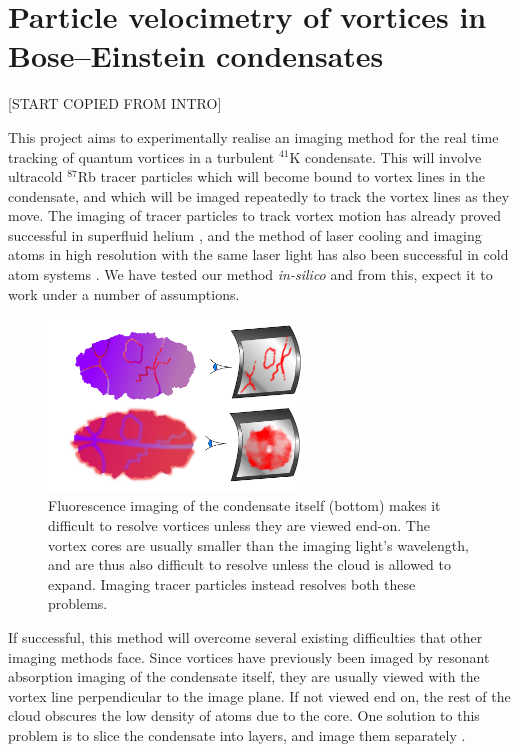 
\chapter{Particle velocimetry of vortices in Bose–Einstein condensates}\label{chap:velocimetry}

[START COPIED FROM INTRO]

This project aims to experimentally realise an imaging method for the real time tracking of quantum vortices in a turbulent $^{41}$K condensate. This will involve ultracold $^{87}$Rb tracer particles which will become bound to vortex lines in the condensate, and which will be imaged repeatedly to track the vortex lines as they move. The imaging of tracer particles to track vortex motion has already proved successful in superfluid helium \cite{bewley_generation_2009, bewley_superfluid_2006, packard_vortex_1982}, and the method of laser cooling and imaging atoms in high resolution with the same laser light has also been successful in cold atom systems \cite{bakr_quantum_2009}. We have tested our method \textit{in-silico} \cite{billington_particle_2010} and from this, expect it to work under a number of assumptions.

\begin{figure}
\begin{center}
\includegraphics[width=0.6\textwidth]{figures/unsorted/side-on.pdf}
\caption{\label{fig:side-on}Fluorescence imaging of the condensate itself (bottom) makes it difficult to resolve vortices unless they are viewed end-on. The vortex cores are usually smaller than the imaging light's wavelength, and are thus also difficult to resolve unless the cloud is allowed to expand. Imaging tracer particles instead resolves both these problems.}
\end{center}
\end{figure}

If successful, this method will overcome several existing difficulties that other imaging methods face. Since vortices have previously been imaged by resonant absorption imaging of the condensate itself, they are usually viewed with the vortex line perpendicular to the image plane. If not viewed end on, the rest of the cloud obscures the low density of atoms due to the core. One solution to this problem is to slice the condensate into layers, and image them separately \cite{anderson_watching_2001}.

